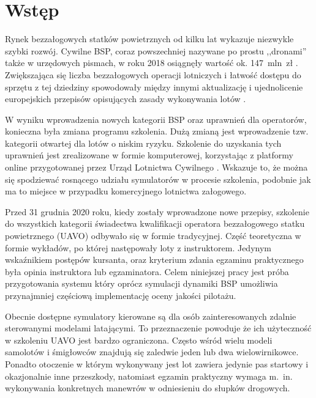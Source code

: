 \newpage
\section{Wstęp}

Rynek bezzałogowych statków powietrznych od kilku lat wykazuje niezwykle szybki rozwój. Cywilne BSP, coraz powszechniej nazywane po prostu ,,dronami'' także w urzędowych pismach, w roku 2018 osiągnęły wartość ok. 147~mln~zł \cite{bialaksiega2019}. Zwiększająca się liczba bezzałogowych operacji lotniczych i łatwość dostępu do sprzętu z tej dziedziny spowodowały między innymi aktualizację i ujednolicenie europejskich przepisów opisujących zasady wykonywania lotów \cite{eu-945-2019}.

W wyniku wprowadzenia nowych kategorii BSP oraz uprawnień dla operatorów, konieczna była zmiana programu szkolenia. Dużą zmianą jest wprowadzenie tzw. kategorii otwartej dla lotów o niskim ryzyku. Szkolenie do uzyskania tych uprawnień jest zrealizowane w formie komputerowej, korzystając z platformy online przygotowanej przez Urząd Lotnictwa Cywilnego \cite{ulc2019}. Wskazuje to, że można się spodziewać rosnącego udziału symulatorów w procesie szkolenia, podobnie jak ma to miejsce w przypadku komercyjnego lotnictwa załogowego.

Przed 31 grudnia 2020 roku, kiedy zostały wprowadzone nowe przepisy, szkolenie do wszystkich kategorii świadectwa kwalifikacji operatora bezzałogowego statku powietrznego (UAVO) odbywało się w formie tradycyjnej. Część teoretyczna w formie wykładów, po której następowały loty z instruktorem. Jedynym wskaźnikiem postępów kursanta, oraz kryterium zdania egzaminu praktycznego była opinia instruktora lub egzaminatora. Celem niniejszej pracy jest próba przygotowania systemu który oprócz symulacji dynamiki BSP umożliwia przynajmniej częściową implementację oceny jakości pilotażu.

Obecnie dostępne symulatory kierowane są dla osób zainteresowanych zdalnie sterowanymi modelami latającymi. To przeznaczenie powoduje że ich użyteczność w szkoleniu UAVO jest bardzo ograniczona. Często wśród wielu modeli samolotów i śmigłowców znajdują się zaledwie jeden lub dwa wielowirnikowce. Ponadto otoczenie w którym wykonywany jest lot zawiera jedynie pas startowy i okazjonalnie inne przeszkody, natomiast egzamin praktyczny wymaga m.~in. wykonywania konkretnych manewrów w odniesieniu do słupków drogowych.
